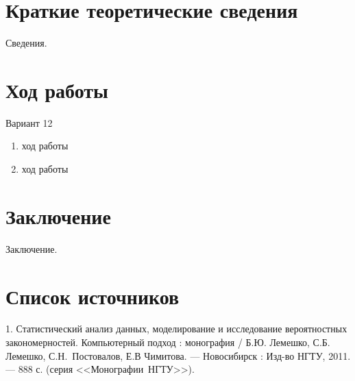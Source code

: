 \documentclass[a4paper,14pt]{extarticle}
\begin{document}
\section{Краткие теоретические сведения}

Сведения.

\section{Ход работы}

Вариант 12

\begin{enumerate}

\item ход работы
\item ход работы

\end{enumerate}

\section*{Заключение}

Заключение.

\section*{Список источников}

1. Статистический анализ данных, моделирование и исследование вероятностных
закономерностей. Компьютерный подход : монография / Б.Ю. Лемешко, С.Б. Лемешко,
\mbox{С.Н. Постовалов}, Е.В Чимитова. --- Новосибирск : Изд-во НГТУ, 2011. --- 888 с.
(серия <<\mbox{Монографии НГТУ}>>).
\end{document}
